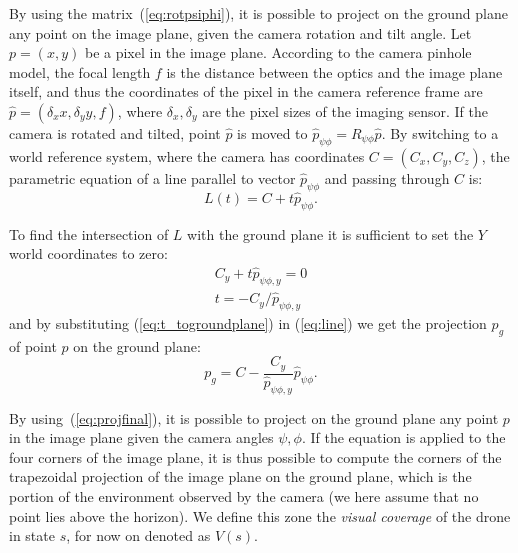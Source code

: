 \documentclass{article}
\begin{document}
By using the matrix~(\ref{eq:rotpsiphi}), it is possible to project on the ground plane any point on the image plane, given the camera rotation and tilt angle. Let $p = (x,y)$ be a pixel in the image plane. According to the camera pinhole model, the focal length $f$ is the distance between the optics and the image plane itself, and thus the coordinates of the pixel in the camera reference frame are $\hat{p}=(\delta_x x, \delta_y y, f)$, where $\delta_x, \delta_y$ are the pixel sizes of the imaging sensor. If the camera is rotated and tilted, point $\hat{p}$ is moved to $\hat{p}_{\psi\phi} = R_{\psi\phi}\hat{p}$. By switching to a world reference system, where the camera has coordinates $C = (C_x, C_y, C_z)$, the parametric equation of a line parallel to vector $\hat{p}_{\psi\phi}$ and passing through $C$ is:
\begin{equation}
	L(t) = C + t \hat{p}_{\psi\phi}.
	\label{eq:line}
\end{equation}

To find the intersection of $L$ with the ground plane it is sufficient to set the $Y$ world coordinates to zero:
\begin{equation}
	\begin{gathered}
	C_y + t \hat{p}_{\psi\phi, y} = 0 \\
	t = -C_y / \hat{p}_{\psi\phi, y}
	\end{gathered}
	\label{eq:t_togroundplane}
\end{equation}
and by substituting (\ref{eq:t_togroundplane}) in (\ref{eq:line}) we get the projection $p_g$ of point $p$ on the ground plane:
\begin{equation}
	p_g = C - \frac{C_y}{\hat{p}_{\psi\phi,y}} \hat{p}_{\psi\phi}.
	\label{eq:projfinal}
\end{equation}

By using~(\ref{eq:projfinal}), it is possible to project on the ground plane any point $p$ in the image plane given the camera angles $\psi, \phi$. If the equation is applied to the four corners of the image plane, it is thus possible to compute the corners of the trapezoidal projection of the image plane on the ground plane, which is the portion of the environment observed by the camera (we here assume that no point lies above the horizon). We define this zone the \emph{visual coverage} of the drone in state $s$, for now on denoted as $V(s)$.
\end{document}
